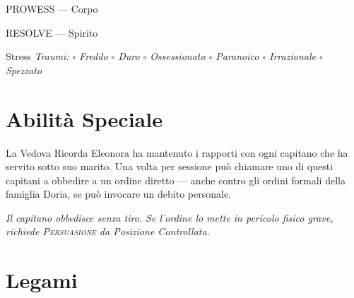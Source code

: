 \begin{attributoblock}[DoriaBlue]{PROWESS — Corpo}
\end{attributoblock}



\begin{attributoblock}[DoriaBlue]{RESOLVE — Spirito}
  
  
\end{attributoblock}

\medskip
\begin{pgclockbox}{Stress \hfill {}}
  \small\textit{Traumi: $\square$ Freddo \quad $\square$ Duro \quad $\square$ Ossessionato \quad $\square$ Paranoico \quad $\square$ Irrazionale \quad $\square$ Spezzato}
\end{pgclockbox}

\section*{Abilità Speciale}

\begin{doriabox}{La Vedova Ricorda}
  Eleonora ha mantenuto i rapporti con ogni capitano che ha servito sotto
  suo marito. Una volta per sessione può chiamare uno di questi capitani
  a obbedire a un ordine diretto — anche contro gli ordini formali della
  famiglia Doria, se può invocare un debito personale.

  \medskip\noindent\textit{Il capitano obbedisce senza tiro. Se l'ordine lo mette
  in pericolo fisico grave, richiede \textsc{Persuasione} da Posizione Controllata.}
\end{doriabox}

\section*{Legami}

